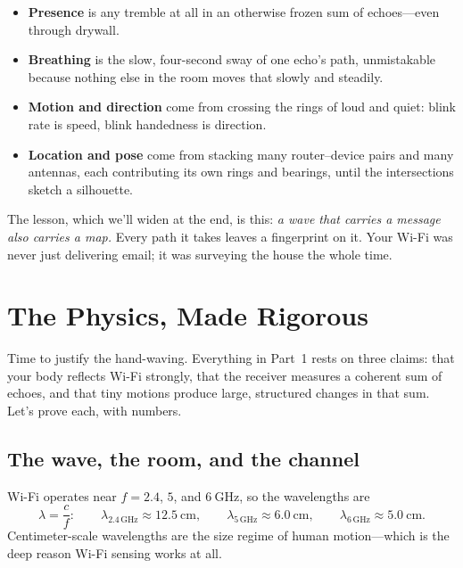 \documentclass[11pt, letterpaper]{article}
\begin{document}
\begin{itemize}[nosep]
  \item \textbf{Presence} is any tremble at all in an otherwise frozen sum of echoes---even through drywall.
  \item \textbf{Breathing} is the slow, four-second sway of one echo's path, unmistakable because nothing else in the room moves that slowly and steadily.
  \item \textbf{Motion and direction} come from crossing the rings of loud and quiet: blink rate is speed, blink handedness is direction.
  \item \textbf{Location and pose} come from stacking many router--device pairs and many antennas, each contributing its own rings and bearings, until the intersections sketch a silhouette.
\end{itemize}

The lesson, which we'll widen at the end, is this: \textit{a wave that carries a message also carries a map.} Every path it takes leaves a fingerprint on it. Your Wi-Fi was never just delivering email; it was surveying the house the whole time.


\section{The Physics, Made Rigorous}

Time to justify the hand-waving. Everything in Part~1 rests on three claims: that your body reflects Wi-Fi strongly, that the receiver measures a coherent sum of echoes, and that tiny motions produce large, structured changes in that sum. Let's prove each, with numbers.

\subsection{The wave, the room, and the channel}

Wi-Fi operates near $f = 2.4$, $5$, and $6\ \text{GHz}$, so the wavelengths are
\begin{equation}
  \lambda = \frac{c}{f}: \qquad
  \lambda_{2.4\,\text{GHz}} \approx 12.5\ \text{cm}, \qquad
  \lambda_{5\,\text{GHz}} \approx 6.0\ \text{cm}, \qquad
  \lambda_{6\,\text{GHz}} \approx 5.0\ \text{cm}.
\end{equation}
Centimeter-scale wavelengths are the size regime of human motion---which is the deep reason Wi-Fi sensing works at all.
\end{document}

